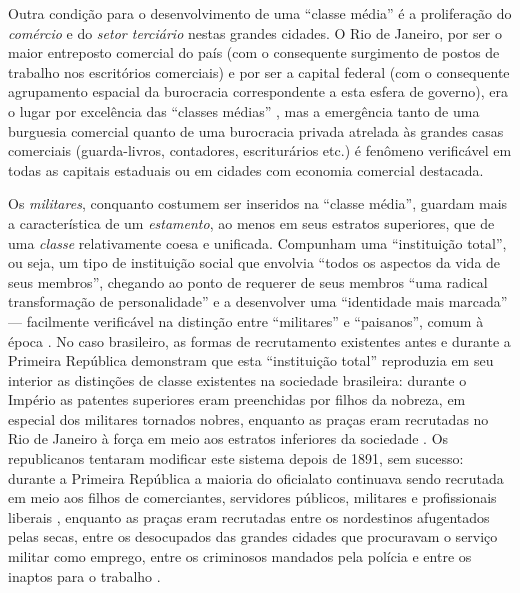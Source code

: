 Outra condição para o desenvolvimento de uma ``classe média'' é a proliferação do \textit{comércio} e do \textit{setor terciário} nestas grandes cidades. O Rio de Janeiro, por ser o maior entreposto comercial do país (com o consequente surgimento de postos de trabalho nos escritórios comerciais) e por ser a capital federal (com o consequente agrupamento espacial da burocracia correspondente a esta esfera de governo), era o lugar por excelência das ``classes médias'' \cite[p.~119]{pinheiro_clamed_1977}, mas a emergência tanto de uma burguesia comercial quanto de uma burocracia privada atrelada às grandes casas comerciais (guarda-livros, contadores, escriturários etc.) é fenômeno verificável em todas as capitais estaduais ou em cidades com economia comercial destacada. 

Os \textit{militares}, conquanto costumem ser inseridos na ``classe média'', guardam mais a característica de um \textit{estamento}, ao menos em seus estratos superiores, que de uma \textit{classe} relativamente coesa e unificada. Compunham uma ``instituição total'', ou seja, um tipo de instituição social que envolvia ``todos os aspectos da vida de seus membros'', chegando ao ponto de requerer de seus membros ``uma radical transformação de personalidade'' e a desenvolver uma ``identidade mais marcada'' --- facilmente verificável na distinção entre ``militares'' e ``paisanos'', comum à época \cite[p.~181]{carvalho_militares_1977}. No caso brasileiro, as formas de recrutamento existentes antes e durante a Primeira República demonstram que esta ``instituição total'' reproduzia em seu interior as distinções de classe existentes na sociedade brasileira: durante o Império as patentes superiores eram preenchidas por filhos da nobreza, em especial dos militares tornados nobres, enquanto as praças eram recrutadas no Rio de Janeiro à força em meio aos estratos inferiores da sociedade \cite[pp.~186-192]{carvalho_militares_1977}. Os republicanos tentaram modificar este sistema depois de 1891, sem sucesso: durante a Primeira República a maioria do oficialato continuava sendo recrutada em meio aos filhos de comerciantes, servidores públicos, militares e profissionais liberais \cite[p.~188]{carvalho_militares_1977}, enquanto as praças eram recrutadas entre os nordestinos afugentados pelas secas, entre os desocupados das grandes cidades que procuravam o serviço militar como emprego, entre os criminosos mandados pela polícia e entre os inaptos para o trabalho \cite[p.~190]{carvalho_militares_1977}. 

